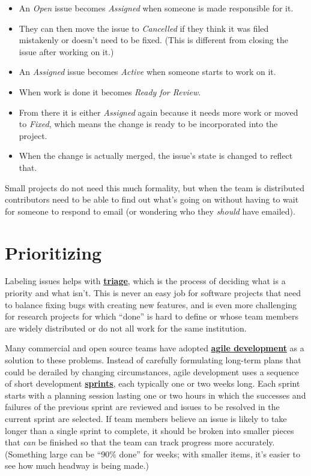 \documentclass[
]{krantz}
\newcommand{\gref}[2]{\hyperlink{#2}{\textbf{#1}}}
\begin{document}
\begin{itemize}
\item
  An \emph{Open} issue becomes \emph{Assigned} when someone is made responsible for it.
\item
  They can then move the issue to \emph{Cancelled} if they think it was filed mistakenly
  or doesn't need to be fixed.
  (This is different from closing the issue after working on it.)
\item
  An \emph{Assigned} issue becomes \emph{Active} when someone starts to work on it.
\item
  When work is done it becomes \emph{Ready for Review}.
\item
  From there it is either \emph{Assigned} again because it needs more work
  or moved to \emph{Fixed},
  which means the change is ready to be incorporated into the project.
\item
  When the change is actually merged,
  the issue's state is changed to reflect that.
\end{itemize}

Small projects do not need this much formality,
but when the team is distributed
contributors need to be able to find out what's going on
without having to wait for someone to respond to email
(or wondering who they \emph{should} have emailed).

\hypertarget{teams-prioritize}{%
\section{Prioritizing}\label{teams-prioritize}}

Labeling issues helps with \gref{triage}{triage},
which is the process of deciding what is a priority and what isn't.
This is never an easy job for software projects
that need to balance fixing bugs with creating new features,
and is even more challenging for research projects
for which ``done'' is hard to define
or whose team members are widely distributed
or do not all work for the same institution.

Many commercial and open source teams have adopted
\gref{agile development}{agile} as a solution to these problems.
Instead of carefully formulating long-term plans that could be derailed by changing circumstances,
agile development uses a sequence of short development
\gref{sprints}{sprint},
each typically one or two weeks long.
Each sprint starts with a planning session lasting one or two hours
in which the successes and failures of the previous sprint are reviewed
and issues to be resolved in the current sprint are selected.
If team members believe an issue is likely to take longer than a single sprint to complete,
it should be broken into smaller pieces that \emph{can} be finished
so that the team can track progress more accurately.
(Something large can be ``90\% done'' for weeks;
with smaller items,
it's easier to see how much headway is being made.)
\end{document}
